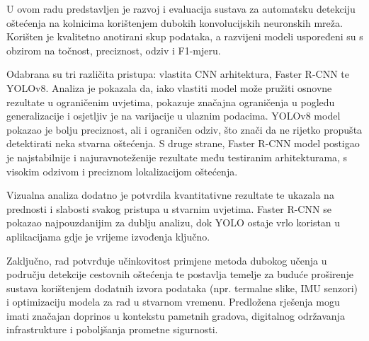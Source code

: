 \documentclass[conference]{IEEEtran}
\begin{document}
U ovom radu predstavljen je razvoj i evaluacija sustava za automatsku detekciju oštećenja na kolnicima korištenjem dubokih konvolucijskih neuronskih mreža. Korišten je kvalitetno anotirani skup podataka, a razvijeni modeli uspoređeni su s obzirom na točnost, preciznost, odziv i F1-mjeru.

Odabrana su tri različita pristupa: vlastita CNN arhitektura, Faster R-CNN te YOLOv8. Analiza je pokazala da, iako vlastiti model može pružiti osnovne rezultate u ograničenim uvjetima, pokazuje značajna ograničenja u pogledu generalizacije i osjetljiv je na varijacije u ulaznim podacima. YOLOv8 model pokazao je bolju preciznost, ali i ograničen odziv, što znači da ne rijetko propušta detektirati neka stvarna oštećenja. S druge strane, Faster R-CNN model postigao je najstabilnije i najuravnoteženije rezultate među testiranim arhitekturama, s visokim odzivom i preciznom lokalizacijom oštećenja.

Vizualna analiza dodatno je potvrdila kvantitativne rezultate te ukazala na prednosti i slabosti svakog pristupa u stvarnim uvjetima. Faster R-CNN se pokazao najpouzdanijim za dublju analizu, dok YOLO ostaje vrlo koristan u aplikacijama gdje je vrijeme izvođenja ključno.

Zaključno, rad potvrđuje učinkovitost primjene metoda dubokog učenja u području detekcije cestovnih oštećenja te postavlja temelje za buduće proširenje sustava korištenjem dodatnih izvora podataka (npr. termalne slike, IMU senzori) i optimizaciju modela za rad u stvarnom vremenu. Predložena rješenja mogu imati značajan doprinos u kontekstu pametnih gradova, digitalnog održavanja infrastrukture i poboljšanja prometne sigurnosti.


\end{document}

